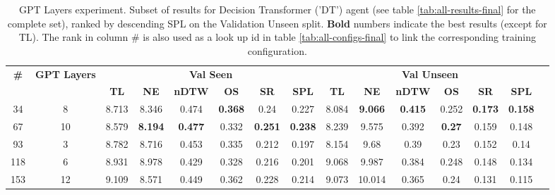 \begin{table}
\centering
\caption{\label{tab:dt_layers}GPT Layers experiment. Subset of results for Decision Transformer ('DT') agent (see table \ref{tab:all-results-final} for the complete set), ranked by descending SPL on the Validation Unseen split. \textbf{Bold} numbers indicate the best results (except for TL). The rank in column \# is also used as a look up id in table \ref{tab:all-configs-final} to link the corresponding training configuration.}
\begin{tabular}{@{\hskip3pt}c@{\hskip3pt}c@{\hskip3pt}c@{\hskip3pt}c@{\hskip3pt}c@{\hskip3pt}c@{\hskip3pt}c@{\hskip3pt}c@{\hskip3pt}c@{\hskip3pt}c@{\hskip3pt}c@{\hskip3pt}c@{\hskip3pt}c@{\hskip3pt}c@{\hskip3pt}c}
\toprule
                                  \textbf{\#} & \textbf{GPT Layers} & \multicolumn{6}{c}{\textbf{Val Seen}} & \multicolumn{6}{c}{\textbf{Val Unseen}} \\
\cmidrule(l){3-8}\cmidrule(l){9-14}\textbf{~} &          \textbf{~} &       \textbf{TL} &     \textbf{NE} &   \textbf{nDTW} &     \textbf{OS} &     \textbf{SR} &    \textbf{SPL} &         \textbf{TL} &     \textbf{NE} &   \textbf{nDTW} &    \textbf{OS} &     \textbf{SR} &    \textbf{SPL} \\
\midrule
                                           34 &                   8 &             8.713 &           8.346 &           0.474 &  \textbf{0.368} &            0.24 &           0.227 &               8.084 &  \textbf{9.066} &  \textbf{0.415} &          0.252 &  \textbf{0.173} &  \textbf{0.158} \\
                                           67 &                  10 &             8.579 &  \textbf{8.194} &  \textbf{0.477} &           0.332 &  \textbf{0.251} &  \textbf{0.238} &               8.239 &           9.575 &           0.392 &  \textbf{0.27} &           0.159 &           0.148 \\
                                           93 &                   3 &             8.782 &           8.716 &           0.453 &           0.335 &           0.212 &           0.197 &               8.154 &            9.68 &            0.39 &           0.23 &           0.152 &            0.14 \\
                                          118 &                   6 &             8.931 &           8.978 &           0.429 &           0.328 &           0.216 &           0.201 &               9.068 &           9.987 &           0.384 &          0.248 &           0.148 &           0.134 \\
                                          153 &                  12 &             9.109 &           8.571 &           0.449 &           0.362 &           0.228 &           0.214 &               9.073 &          10.014 &           0.365 &           0.24 &           0.131 &           0.115 \\
\bottomrule
\end{tabular}
\end{table}
